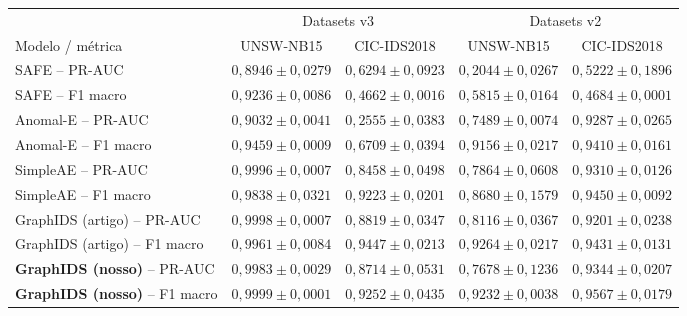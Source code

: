 \begin{tabular}{l cc cc}
\toprule
& \multicolumn{2}{c}{Datasets v3} & \multicolumn{2}{c}{Datasets v2} \\
\cmidrule(lr){2-3}\cmidrule(lr){4-5}
Modelo / métrica & UNSW-NB15 & CIC-IDS2018 & UNSW-NB15 & CIC-IDS2018 \\
\midrule
SAFE -- PR-AUC & $0,8946 \pm 0,0279$ & $0,6294 \pm 0,0923$ & $0,2044 \pm 0,0267$ & $0,5222 \pm 0,1896$ \\
SAFE -- F1 macro & $0,9236 \pm 0,0086$ & $0,4662 \pm 0,0016$ & $0,5815 \pm 0,0164$ & $0,4684 \pm 0,0001$ \\
Anomal-E -- PR-AUC & $0,9032 \pm 0,0041$ & $0,2555 \pm 0,0383$ & $0,7489 \pm 0,0074$ & $0,9287 \pm 0,0265$ \\
Anomal-E -- F1 macro & $0,9459 \pm 0,0009$ & $0,6709 \pm 0,0394$ & $0,9156 \pm 0,0217$ & $0,9410 \pm 0,0161$ \\
SimpleAE -- PR-AUC & $0,9996 \pm 0,0007$ & $0,8458 \pm 0,0498$ & $0,7864 \pm 0,0608$ & $0,9310 \pm 0,0126$ \\
SimpleAE -- F1 macro & $0,9838 \pm 0,0321$ & $0,9223 \pm 0,0201$ & $0,8680 \pm 0,1579$ & $0,9450 \pm 0,0092$ \\
GraphIDS (artigo) -- PR-AUC & $0,9998 \pm 0,0007$ & $0,8819 \pm 0,0347$ & $0,8116 \pm 0,0367$ & $0,9201 \pm 0,0238$ \\
GraphIDS (artigo) -- F1 macro & $0,9961 \pm 0,0084$ & $0,9447 \pm 0,0213$ & $0,9264 \pm 0,0217$ & $0,9431 \pm 0,0131$ \\
\midrule
\textbf{GraphIDS (nosso)} -- PR-AUC & $0,9983 \pm 0,0029$ & $0,8714 \pm 0,0531$ & $0,7678 \pm 0,1236$ & $0,9344 \pm 0,0207$ \\
\textbf{GraphIDS (nosso)} -- F1 macro & $0,9999 \pm 0,0001$ & $0,9252 \pm 0,0435$ & $0,9232 \pm 0,0038$ & $0,9567 \pm 0,0179$ \\
\bottomrule
\end{tabular}
